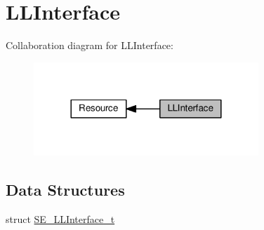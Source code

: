 \hypertarget{group__LLInterface}{}\section{L\+L\+Interface}
\label{group__LLInterface}
Collaboration diagram for L\+L\+Interface\+:\nopagebreak
\begin{figure}[H]
\begin{center}
\leavevmode
\includegraphics[width=240pt]{group__LLInterface}
\end{center}
\end{figure}
\subsection*{Data Structures}
\begin{DoxyCompactItemize}
\item 
struct \hyperlink{structSE__LLInterface__t}{S\+E\+\_\+\+L\+L\+Interface\+\_\+t}
\end{DoxyCompactItemize}
